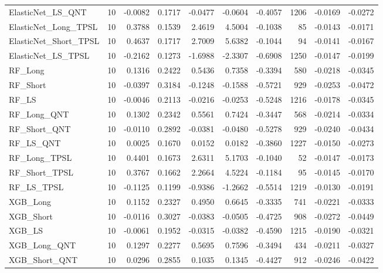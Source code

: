 \begin{tabular}{llrrrrrrrr}
ElasticNet\_LS\_QNT & 10 & -0.0082 & 0.1717 & -0.0477 & -0.0604 & -0.4057 & 1206 & -0.0169 & -0.0272 \\
\cline{1-10}
ElasticNet\_Long\_TPSL & 10 & 0.3788 & 0.1539 & 2.4619 & 4.5004 & -0.1038 & 85 & -0.0143 & -0.0171 \\
\cline{1-10}
ElasticNet\_Short\_TPSL & 10 & 0.4637 & 0.1717 & 2.7009 & 5.6382 & -0.1044 & 94 & -0.0141 & -0.0167 \\
\cline{1-10}
ElasticNet\_LS\_TPSL & 10 & -0.2162 & 0.1273 & -1.6988 & -2.3307 & -0.6908 & 1250 & -0.0147 & -0.0199 \\
\cline{1-10}
RF\_Long & 10 & 0.1316 & 0.2422 & 0.5436 & 0.7358 & -0.3394 & 580 & -0.0218 & -0.0345 \\
\cline{1-10}
RF\_Short & 10 & -0.0397 & 0.3184 & -0.1248 & -0.1588 & -0.5721 & 929 & -0.0253 & -0.0472 \\
\cline{1-10}
RF\_LS & 10 & -0.0046 & 0.2113 & -0.0216 & -0.0253 & -0.5248 & 1216 & -0.0178 & -0.0345 \\
\cline{1-10}
RF\_Long\_QNT & 10 & 0.1302 & 0.2342 & 0.5561 & 0.7424 & -0.3447 & 568 & -0.0214 & -0.0334 \\
\cline{1-10}
RF\_Short\_QNT & 10 & -0.0110 & 0.2892 & -0.0381 & -0.0480 & -0.5278 & 929 & -0.0240 & -0.0434 \\
\cline{1-10}
RF\_LS\_QNT & 10 & 0.0025 & 0.1670 & 0.0152 & 0.0182 & -0.3860 & 1227 & -0.0150 & -0.0273 \\
\cline{1-10}
RF\_Long\_TPSL & 10 & 0.4401 & 0.1673 & 2.6311 & 5.1703 & -0.1040 & 52 & -0.0147 & -0.0173 \\
\cline{1-10}
RF\_Short\_TPSL & 10 & 0.3767 & 0.1662 & 2.2664 & 4.5224 & -0.1184 & 95 & -0.0145 & -0.0170 \\
\cline{1-10}
RF\_LS\_TPSL & 10 & -0.1125 & 0.1199 & -0.9386 & -1.2662 & -0.5514 & 1219 & -0.0130 & -0.0191 \\
\cline{1-10}
XGB\_Long & 10 & 0.1152 & 0.2327 & 0.4950 & 0.6645 & -0.3335 & 741 & -0.0221 & -0.0333 \\
\cline{1-10}
XGB\_Short & 10 & -0.0116 & 0.3027 & -0.0383 & -0.0505 & -0.4725 & 908 & -0.0272 & -0.0449 \\
\cline{1-10}
XGB\_LS & 10 & -0.0061 & 0.1952 & -0.0315 & -0.0382 & -0.4590 & 1215 & -0.0190 & -0.0321 \\
\cline{1-10}
XGB\_Long\_QNT & 10 & 0.1297 & 0.2277 & 0.5695 & 0.7596 & -0.3494 & 434 & -0.0211 & -0.0327 \\
\cline{1-10}
XGB\_Short\_QNT & 10 & 0.0296 & 0.2855 & 0.1035 & 0.1345 & -0.4427 & 912 & -0.0246 & -0.0422 \\

\end{tabular}
